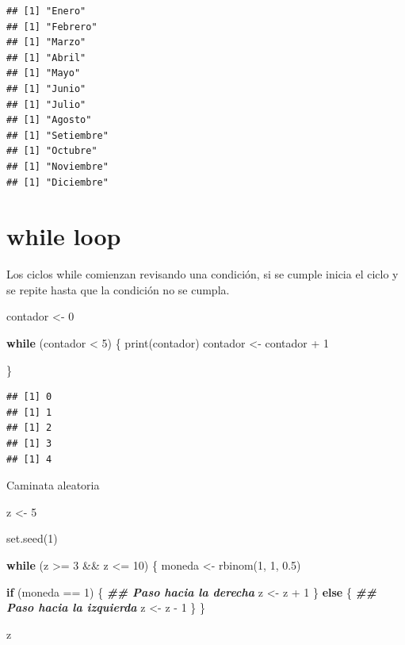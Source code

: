 \documentclass[
  12pt,
]{book}
\newenvironment{Shaded}{\begin{snugshade}}{\end{snugshade}}
\newcommand{\ControlFlowTok}[1]{\textcolor[rgb]{0.13,0.29,0.53}{\textbf{#1}}}
\newcommand{\DecValTok}[1]{\textcolor[rgb]{0.00,0.00,0.81}{#1}}
\newcommand{\DocumentationTok}[1]{\textcolor[rgb]{0.56,0.35,0.01}{\textbf{\textit{#1}}}}
\newcommand{\FloatTok}[1]{\textcolor[rgb]{0.00,0.00,0.81}{#1}}
\newcommand{\FunctionTok}[1]{\textcolor[rgb]{0.00,0.00,0.00}{#1}}
\newcommand{\NormalTok}[1]{#1}
\newcommand{\OtherTok}[1]{\textcolor[rgb]{0.56,0.35,0.01}{#1}}
\newcommand{\SpecialCharTok}[1]{\textcolor[rgb]{0.00,0.00,0.00}{#1}}
\begin{document}
\begin{verbatim}
## [1] "Enero"
## [1] "Febrero"
## [1] "Marzo"
## [1] "Abril"
## [1] "Mayo"
## [1] "Junio"
## [1] "Julio"
## [1] "Agosto"
## [1] "Setiembre"
## [1] "Octubre"
## [1] "Noviembre"
## [1] "Diciembre"
\end{verbatim}

\hypertarget{while-loop}{%
\section{\texorpdfstring{\textbf{while loop}}{while loop}}\label{while-loop}}

Los ciclos while comienzan revisando una condición, si se cumple inicia el ciclo y se repite hasta que la condición no se cumpla.

\begin{Shaded}
\begin{Highlighting}[]
\NormalTok{contador }\OtherTok{\textless{}{-}} \DecValTok{0}

\ControlFlowTok{while}\NormalTok{ (contador }\SpecialCharTok{\textless{}} \DecValTok{5}\NormalTok{) \{}
  \FunctionTok{print}\NormalTok{(contador)}
\NormalTok{  contador }\OtherTok{\textless{}{-}}\NormalTok{ contador }\SpecialCharTok{+} \DecValTok{1}

\NormalTok{\}}
\end{Highlighting}
\end{Shaded}

\begin{verbatim}
## [1] 0
## [1] 1
## [1] 2
## [1] 3
## [1] 4
\end{verbatim}

Caminata aleatoria

\begin{Shaded}
\begin{Highlighting}[]
\NormalTok{z }\OtherTok{\textless{}{-}} \DecValTok{5}

\FunctionTok{set.seed}\NormalTok{(}\DecValTok{1}\NormalTok{)}

\ControlFlowTok{while}\NormalTok{ (z }\SpecialCharTok{\textgreater{}=} \DecValTok{3} \SpecialCharTok{\&\&}\NormalTok{ z }\SpecialCharTok{\textless{}=} \DecValTok{10}\NormalTok{) \{}
\NormalTok{  moneda }\OtherTok{\textless{}{-}} \FunctionTok{rbinom}\NormalTok{(}\DecValTok{1}\NormalTok{, }\DecValTok{1}\NormalTok{, }\FloatTok{0.5}\NormalTok{)}

  \ControlFlowTok{if}\NormalTok{ (moneda }\SpecialCharTok{==} \DecValTok{1}\NormalTok{) \{ }\DocumentationTok{\#\# Paso hacia la derecha}
\NormalTok{    z }\OtherTok{\textless{}{-}}\NormalTok{ z }\SpecialCharTok{+} \DecValTok{1}
\NormalTok{  \} }\ControlFlowTok{else}\NormalTok{ \{          }\DocumentationTok{\#\# Paso hacia la izquierda}
\NormalTok{    z }\OtherTok{\textless{}{-}}\NormalTok{ z }\SpecialCharTok{{-}} \DecValTok{1}
\NormalTok{  \}}
\NormalTok{\}}

\NormalTok{z}
\end{Highlighting}
\end{Shaded}
\end{document}
